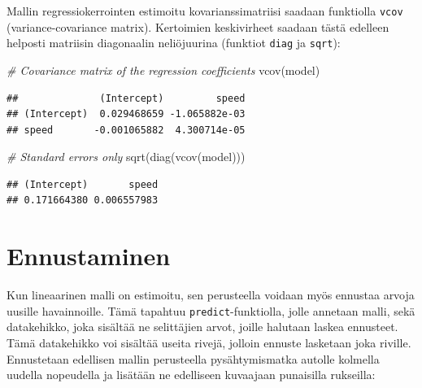 \documentclass[
]{book}
\newenvironment{Shaded}{\begin{snugshade}}{\end{snugshade}}
\newcommand{\CommentTok}[1]{\textcolor[rgb]{0.56,0.35,0.01}{\textit{#1}}}
\newcommand{\FunctionTok}[1]{\textcolor[rgb]{0.00,0.00,0.00}{#1}}
\newcommand{\NormalTok}[1]{#1}
\begin{document}
Mallin regressiokerrointen estimoitu kovarianssimatriisi saadaan funktiolla \texttt{vcov} (variance-covariance matrix). Kertoimien keskivirheet saadaan tästä edelleen helposti matriisin diagonaalin neliöjuurina (funktiot \texttt{diag} ja \texttt{sqrt}):

\begin{Shaded}
\begin{Highlighting}[]
\CommentTok{\# Covariance matrix of the regression coefficients}
\FunctionTok{vcov}\NormalTok{(model)}
\end{Highlighting}
\end{Shaded}

\begin{verbatim}
##              (Intercept)         speed
## (Intercept)  0.029468659 -1.065882e-03
## speed       -0.001065882  4.300714e-05
\end{verbatim}

\begin{Shaded}
\begin{Highlighting}[]
\CommentTok{\# Standard errors only}
\FunctionTok{sqrt}\NormalTok{(}\FunctionTok{diag}\NormalTok{(}\FunctionTok{vcov}\NormalTok{(model)))}
\end{Highlighting}
\end{Shaded}

\begin{verbatim}
## (Intercept)       speed 
## 0.171664380 0.006557983
\end{verbatim}

\hypertarget{ennustaminen}{%
\section{Ennustaminen}\label{ennustaminen}}

Kun lineaarinen malli on estimoitu, sen perusteella voidaan myös ennustaa arvoja uusille havainnoille. Tämä tapahtuu \texttt{predict}-funktiolla, jolle annetaan malli, sekä datakehikko, joka sisältää ne selittäjien arvot, joille halutaan laskea ennusteet. Tämä datakehikko voi sisältää useita rivejä, jolloin ennuste lasketaan joka riville. Ennustetaan edellisen mallin perusteella pysähtymismatka autolle kolmella uudella nopeudella ja lisätään ne edelliseen kuvaajaan punaisilla rukseilla:
\end{document}
